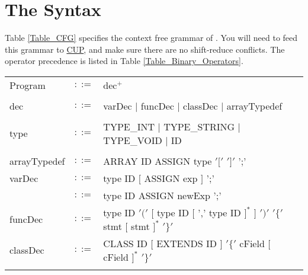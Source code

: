 \documentclass{article}
\begin{document}
\section{The \plname Syntax}
Table \ref{Table_CFG} specifies the context free grammar of \plname.
You will need to feed this grammar to \href{http://www2.cs.tum.edu/projects/cup/}{CUP},
and make sure there are no shift-reduce conflicts.
The operator precedence is listed in Table
\ref{Table_Binary_Operators}. 
\begin{table}[h]
\centering
\begin{tabular}{ l c l }
Program  & $::=$ & dec$^{+}$ \\
\\
dec      & $::=$ & varDec $|$ funcDec $|$ classDec $|$ arrayTypedef \\
\\
type      & $::=$ & TYPE\_INT $|$ TYPE\_STRING $|$ TYPE\_VOID $|$ ID \\
\\
arrayTypedef & $::=$ & ARRAY ID ASSIGN type $'['$ $']'$ ';' \\
varDec   & $::=$ & type ID $[$ ASSIGN exp $]$ ';' \\
         & $::=$ & type ID ASSIGN newExp ';'      \\
funcDec  & $::=$ & type ID $'('$ $[$ type ID $[$ ',' type ID $]^{*}$ $]$ $')'$ %
                   $'\{'$ stmt   $[$ stmt $]^{*}$ $'\}'$                 \\
classDec & $::=$ & CLASS ID $[$ EXTENDS ID $]$ $'\{'$ cField $[$ cField $]^{*}$ $'\}'$ \\
\\

\end{tabular}
\end{table}
\end{document}
